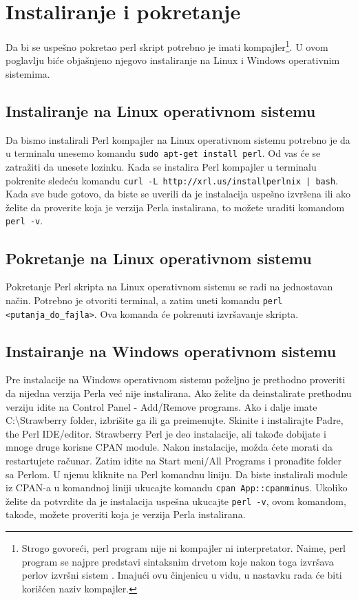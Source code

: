 \documentclass[a4paper]{article}
\begin{document}
\section{Instaliranje i pokretanje}
\label{sec:instalacija}

Da bi se uspešno pokretao perl skript potrebno je imati kompajler\footnote{Strogo govoreći, perl program nije ni kompajler ni interpretator. Naime, perl program se najpre predstavi sintaksnim drvetom koje nakon toga izvršava perlov izvršni sistem \cite{glosar}. Imajući ovu činjenicu u vidu, u nastavku rada će biti korišćen naziv kompajler.}. U ovom poglavlju biće objašnjeno njegovo instaliranje na Linux i Windows operativnim sistemima.

\subsection{Instaliranje na Linux operativnom sistemu}
Da bismo instalirali Perl kompajler na Linux operativnom sistemu potrebno je da u terminalu unesemo komandu {\lstinline!sudo apt-get install perl!}. Od vas će se zatražiti da unesete lozinku. Kada se instalira Perl kompajler u terminalu pokrenite sledeću komandu  {\lstinline !curl -L http://xrl.us/installperlnix | bash!}. Kada sve bude gotovo, da biste se uverili da je instalacija uspešno izvršena ili ako želite da proverite koja je verzija Perla instalirana, to možete uraditi komandom {\lstinline!perl -v!}.

\subsection{Pokretanje na Linux operativnom sistemu}
Pokretanje Perl skripta na Linux operativnom sistemu se radi na jednostavan način. Potrebno je otvoriti terminal, a zatim uneti komandu {\lstinline!perl <putanja_do_fajla>!}. Ova komanda će pokrenuti izvršavanje skripta.

\subsection{Instairanje na Windows operativnom sistemu}
Pre instalacije na Windows operativnom sistemu poželjno je  prethodno proveriti da nijedna verzija Perla već nije instalirana. Ako želite da deinstalirate prethodnu verziju idite na  Control Panel - Add/Remove programs. Ako i dalje imate C:\textbackslash Strawberry folder, izbrišite ga ili ga preimenujte. Skinite i instalirajte Padre, the Perl IDE/editor. Strawberry Perl je deo instalacije, ali takođe dobijate i mnoge druge korisne CPAN module. Nakon instalacije, možda ćete morati da restartujete računar. Zatim idite na Start meni/All Programs i pronađite folder sa Perlom. U njemu kliknite na Perl komandnu liniju.  Da biste instalirali module iz CPAN-a u komandnoj liniji ukucajte komandu {\lstinline!cpan App::cpanminus!}. Ukoliko želite da  potvrdite da je instalacija uspešna ukucajte {\lstinline!perl -v!}, ovom komandom, takođe, možete proveriti koja je verzija Perla instalirana.
\end{document}
